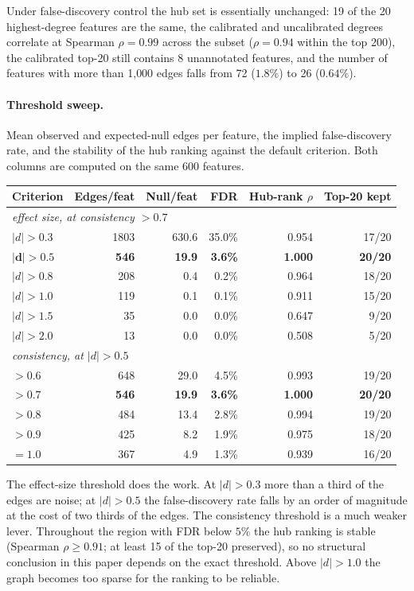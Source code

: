\documentclass[10pt,letterpaper]{article}
\begin{document}
Under false-discovery control the hub set is essentially unchanged: 19 of the 20 highest-degree features are the same, the calibrated and uncalibrated degrees correlate at Spearman $\rho=0.99$ across the subset ($\rho=0.94$ within the top 200), the calibrated top-20 still contains 8 unannotated features, and the number of features with more than 1{,}000 edges falls from 72 ($1.8\%$) to 26 ($0.64\%$).

\paragraph{Threshold sweep.} Mean observed and expected-null edges per feature, the implied false-discovery rate, and the stability of the hub ranking against the default criterion. Both columns are computed on the same 600 features.

\begin{center}
\begin{tabular}{lrrrrr}
\toprule
Criterion & Edges/feat & Null/feat & FDR & Hub-rank $\rho$ & Top-20 kept \\
\midrule
\multicolumn{6}{l}{\emph{effect size, at consistency $>0.7$}}\\
$|d|>0.3$ & 1803 & 630.6 & 35.0\% & 0.954 & 17/20 \\
$\mathbf{|d|>0.5}$ & \textbf{546} & \textbf{19.9} & \textbf{3.6\%} & \textbf{1.000} & \textbf{20/20} \\
$|d|>0.8$ & 208 & 0.4 & 0.2\% & 0.964 & 18/20 \\
$|d|>1.0$ & 119 & 0.1 & 0.1\% & 0.911 & 15/20 \\
$|d|>1.5$ & 35 & 0.0 & 0.0\% & 0.647 & 9/20 \\
$|d|>2.0$ & 13 & 0.0 & 0.0\% & 0.508 & 5/20 \\
\midrule
\multicolumn{6}{l}{\emph{consistency, at $|d|>0.5$}}\\
$>0.6$ & 648 & 29.0 & 4.5\% & 0.993 & 19/20 \\
$\mathbf{>0.7}$ & \textbf{546} & \textbf{19.9} & \textbf{3.6\%} & \textbf{1.000} & \textbf{20/20} \\
$>0.8$ & 484 & 13.4 & 2.8\% & 0.994 & 19/20 \\
$>0.9$ & 425 & 8.2 & 1.9\% & 0.975 & 18/20 \\
$=1.0$ & 367 & 4.9 & 1.3\% & 0.939 & 16/20 \\
\bottomrule
\end{tabular}
\end{center}

The effect-size threshold does the work. At $|d|>0.3$ more than a third of the edges are noise; at $|d|>0.5$ the false-discovery rate falls by an order of magnitude at the cost of two thirds of the edges. The consistency threshold is a much weaker lever. Throughout the region with FDR below $5\%$ the hub ranking is stable (Spearman $\rho\geq0.91$; at least 15 of the top-20 preserved), so no structural conclusion in this paper depends on the exact threshold. Above $|d|>1.0$ the graph becomes too sparse for the ranking to be reliable.
\end{document}
